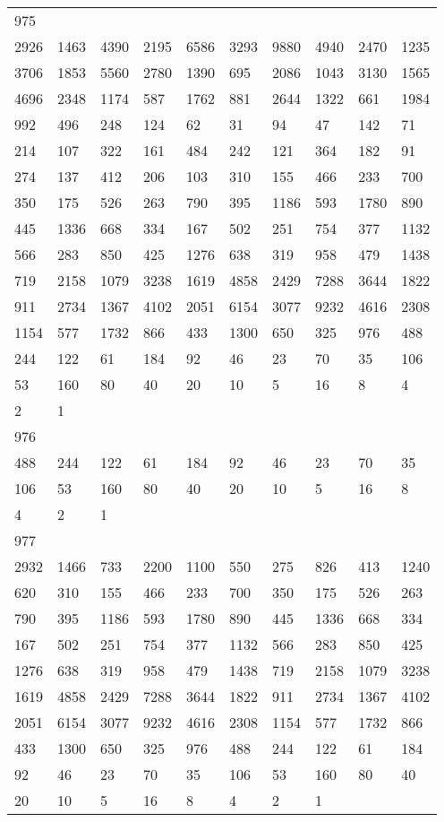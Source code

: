 \begin{longtable}{*{10}{l}}
975&&&&&&&&&\\
2926& 1463& 4390& 2195& 6586& 3293& 9880& 4940& 2470& 1235\\
3706& 1853& 5560& 2780& 1390& 695& 2086& 1043& 3130& 1565\\
4696& 2348& 1174& 587& 1762& 881& 2644& 1322& 661& 1984\\
992& 496& 248& 124& 62& 31& 94& 47& 142& 71\\
214& 107& 322& 161& 484& 242& 121& 364& 182& 91\\
274& 137& 412& 206& 103& 310& 155& 466& 233& 700\\
350& 175& 526& 263& 790& 395& 1186& 593& 1780& 890\\
445& 1336& 668& 334& 167& 502& 251& 754& 377& 1132\\
566& 283& 850& 425& 1276& 638& 319& 958& 479& 1438\\
719& 2158& 1079& 3238& 1619& 4858& 2429& 7288& 3644& 1822\\
911& 2734& 1367& 4102& 2051& 6154& 3077& 9232& 4616& 2308\\
1154& 577& 1732& 866& 433& 1300& 650& 325& 976& 488\\
244& 122& 61& 184& 92& 46& 23& 70& 35& 106\\
53& 160& 80& 40& 20& 10& 5& 16& 8& 4\\
2& 1& \\

976&&&&&&&&&\\
488& 244& 122& 61& 184& 92& 46& 23& 70& 35\\
106& 53& 160& 80& 40& 20& 10& 5& 16& 8\\
4& 2& 1& \\

977&&&&&&&&&\\
2932& 1466& 733& 2200& 1100& 550& 275& 826& 413& 1240\\
620& 310& 155& 466& 233& 700& 350& 175& 526& 263\\
790& 395& 1186& 593& 1780& 890& 445& 1336& 668& 334\\
167& 502& 251& 754& 377& 1132& 566& 283& 850& 425\\
1276& 638& 319& 958& 479& 1438& 719& 2158& 1079& 3238\\
1619& 4858& 2429& 7288& 3644& 1822& 911& 2734& 1367& 4102\\
2051& 6154& 3077& 9232& 4616& 2308& 1154& 577& 1732& 866\\
433& 1300& 650& 325& 976& 488& 244& 122& 61& 184\\
92& 46& 23& 70& 35& 106& 53& 160& 80& 40\\
20& 10& 5& 16& 8& 4& 2& 1& \\


\end{longtable}
